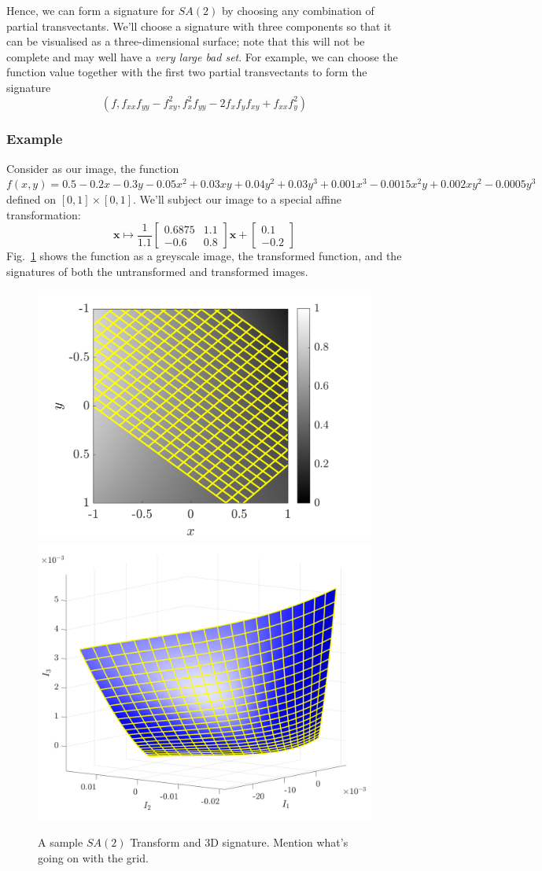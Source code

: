 \documentclass[review,onefignum,onetabnum]{siamonline190516}
\begin{document}
Hence, we can form a signature for $SA(2)$ by choosing any combination of
partial transvectants. We'll choose a signature with three components so that
it can be visualised as a three-dimensional surface; note that this will not
be complete and may well have a \emph{very large bad set}. For example, we can choose the function value together with the first two partial transvectants to form the signature
\begin{equation*}
    \left(f, f_{xx}f_{yy}-f_{xy}^2, f_x^2f_{yy} - 2f_xf_yf_{xy} + f_{xx}f_y^2\right)
\end{equation*}

\subsubsection{Example}
Consider as our image, the function $f(x, y) = 0.5 - 0.2x - 0.3y - 0.05x^2 +
0.03xy + 0.04y^2 + 0.03y^3 +0.001x^3 - 0.0015x^2y + 0.002xy^2 - 0.0005y^3$
defined on $[0, 1]\times[0, 1]$.
We'll subject our image to a special affine transformation:
\begin{equation*}
\mathbf{x} \mapsto \frac{1}{1.1}\begin{bmatrix} 0.6875 & 1.1 \\ -0.6 & 0.8 \end{bmatrix}\mathbf{x} + \begin{bmatrix} 0.1 \\ -0.2 \end{bmatrix}
\end{equation*}
Fig.~\ref{fig:SA2} shows the function as a greyscale image, the transformed
function, and the signatures of both the untransformed and transformed
images.
\begin{figure}
\centering
\includegraphics[width=.45\textwidth]{Figs/f_transformed_SA2.png}
\includegraphics[width=.45\textwidth]{Figs/SA2_signature.png}
\caption{ A sample $SA(2)$ Transform and 3D signature. Mention what's going on with the grid.}
\label{fig:SA2}
\end{figure}
\end{document}
